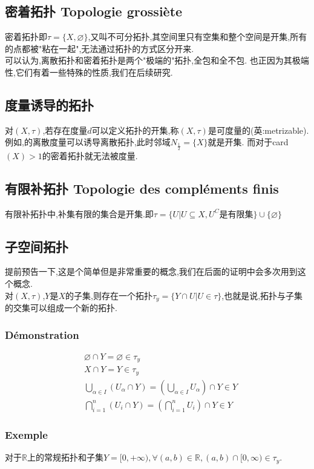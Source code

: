 \documentclass[12pt, a4paper, oneside]{ctexbook}
\newcommand{\R }{\mathbb{R}}%
\begin{document}
  \subsection{密着拓扑 Topologie grossiète}
  密着拓扑即$\tau=\{X,\varnothing \}$,又叫不可分拓扑,其空间里只有空集和整个空间是开集,所有的点都被"粘在一起",无法通过拓扑的方式区分开来.\\
  
  可以认为,离散拓扑和密着拓扑是两个"极端的"拓扑,全包和全不包.
  也正因为其极端性,它们有着一些特殊的性质,我们在后续研究.
  
  \subsection{度量诱导的拓扑}
  对$(X,\tau)$,若存在度量$d$可以定义拓扑的开集,称$(X,\tau)$是可度量的(英:metrizable).
  例如,的离散度量可以诱导离散拓扑,此时邻域$N_\frac{1}{2}=\{X\}$就是开集.
  而对于card$(X)>1$的密着拓扑就无法被度量.
  \subsection{有限补拓扑 Topologie des compléments finis}
  有限补拓扑中,补集有限的集合是开集.即$\tau=\{U|U\subseteq X,U^C\text{是有限集} \}\cup \{\varnothing\}$

  \subsection{子空间拓扑}\label{myref:soustopo}
  提前预告一下,这是个简单但是非常重要的概念,我们在后面的证明中会多次用到这个概念.\\
  对$(X,\tau)$,$Y$是$X$的子集,则存在一个拓扑$\tau_y=\{Y\cap U| U\in\tau\}$,也就是说,拓扑与子集的交集可以组成一个新的拓扑.
  \subsubsection{Démonstration}
  $$
  \begin{aligned}&
  \varnothing\cap Y=\varnothing\in\tau_y\\&
  X\cap Y=Y\in\tau_y\\&
  \bigcup_{\alpha\in I}(U_\alpha\cap Y)=(\bigcup_{\alpha\in I}U_\alpha)\cap Y\in Y\\&
  \bigcap^n_{i=1}(U_i\cap Y)=( \bigcap^n_{i=1}U_i)\cap Y\in Y
  \end{aligned}
  $$
  \subsubsection{Exemple}
  对于$\R$上的常规拓扑和子集$Y=[0,+\infty),\forall (a,b)\in\R,(a,b)\cap[0,\infty)\in\tau_y$.
\end{document}
